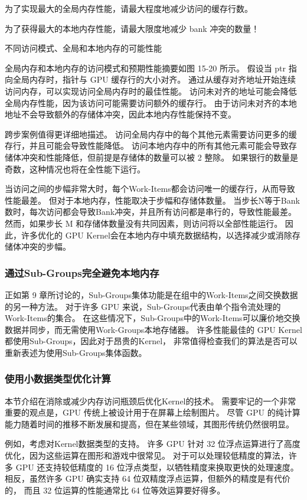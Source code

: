 \begin{remark}
为了实现最大的全局内存性能，请最大程度地减少访问的缓存行数。

为了获得最大的本地内存性能，请最大限度地减少 bank 冲突的数量！
\end{remark}

{\color{red} 不同访问模式、全局和本地内存的可能性能}

全局内存和本地内存的访问模式和预期性能摘要如图 15-20 所示。 
假设当 ptr 指向全局内存时，指针与 GPU 缓存行的大小对齐。 
通过从缓存对齐地址开始连续访问内存，可以实现访问全局内存时的最佳性能。 
访问未对齐的地址可能会降低全局内存性能，因为该访问可能需要访问额外的缓存行。 
由于访问未对齐的本地地址不会导致额外的存储体冲突，因此本地内存性能保持不变。

跨步案例值得更详细地描述。 访问全局内存中的每个其他元素需要访问更多的缓存行，并且可能会导致性能降低。 
访问本地内存中的所有其他元素可能会导致存储体冲突和性能降低，但前提是存储体的数量可以被 2 整除。 
如果银行的数量是奇数，这种情况也将在全性能下运行。

当访问之间的步幅非常大时，每个Work-Items都会访问唯一的缓存行，从而导致性能最差。 
但对于本地内存，性能取决于步幅和存储体数量。 
当步长N等于Bank数时，每次访问都会导致Bank冲突，并且所有访问都是串行的，导致性能最差。 
然而，如果步长 M 和存储体数量没有共同因素，则访问将以全部性能运行。 
因此，许多优化的 GPU Kernel会在本地内存中填充数据结构，以选择减少或消除存储体冲突的步幅。

\subsubsection{通过Sub-Groups完全避免本地内存}
正如第 9 章所讨论的，Sub-Groups集体功能是在组中的Work-Items之间交换数据的另一种方法。 
对于许多 GPU 来说，Sub-Groups代表由单个指令流处理的Work-Items的集合。 
在这些情况下，Sub-Groups中的Work-Items可以廉价地交换数据并同步，而无需使用Work-Groups本地存储器。 
许多性能最佳的 GPU Kernel都使用Sub-Groups，因此对于昂贵的Kernel，
非常值得检查我们的算法是否可以重新表述为使用Sub-Groups集体函数。

\subsubsection{使用小数据类型优化计算}
本节介绍在消除或减少内存访问瓶颈后优化Kernel的技术。 
需要牢记的一个非常重要的观点是，GPU 传统上被设计用于在屏幕上绘制图片。 
尽管 GPU 的纯计算能力随着时间的推移不断发展和提高，但在某些领域，其图形传统仍然很明显。

例如，考虑对Kernel数据类型的支持。 许多 GPU 针对 32 位浮点运算进行了高度优化，因为这些运算在图形和游戏中很常见。 
对于可以处理较低精度的算法，许多 GPU 还支持较低精度的 16 位浮点类型，以牺牲精度来换取更快的处理速度。 
相反，虽然许多 GPU 确实支持 64 位双精度浮点运算，但额外的精度是有代价的，
而且 32 位运算的性能通常比 64 位等效运算要好得多。

